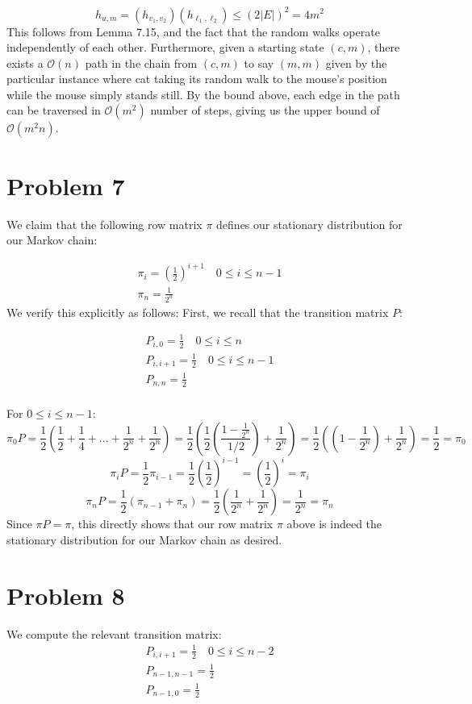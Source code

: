 \documentclass[12pt]{article}%
\begin{document}
$$ h_{u,m} = (h_{v_1,v_2})(h_{\ell_1,\ell_2}) \leq (2|E|)^2 = 4m^2 $$
This follows from Lemma 7.15, and the fact that the random walks operate independently of each other. Furthermore, given a starting state $(c,m)$, there exists a $\mathcal{O}(n)$ path in the chain from $(c,m)$ to say $(m,m)$ given by the particular instance where cat taking its random walk to the mouse's position while the mouse simply stands still. By the bound above, each edge in the path can be traversed in $\mathcal{O}(m^2)$ number of steps, giving us the upper bound of $\mathcal{O}(m^2n)$.

\section*{Problem 7}
We claim that the following row matrix $\pi$ defines our stationary distribution for our Markov chain:

\begin{gather*}
\pi_{i} = {\left(\frac{1}{2}\right)^{i+1}} \quad 0 \leq i \leq n-1 \\
\pi_{n} = \frac{1}{2^{n}}
\end{gather*}
We verify this explicitly as follows: First, we recall that the transition matrix $P$:

\begin{gather*}
P_{i,0} = \frac{1}{2} \quad 0 \leq i \leq n \\
P_{i,i+1} = \frac{1}{2} \quad 0 \leq i \leq n-1 \\
P_{n,n} = \frac{1}{2} \\
\end{gather*}

For $ 0 \leq i \leq n-1$:
$$ \pi_0 P = \frac{1}{2}\left(\frac{1}{2} + \frac{1}{4} + ... + \frac{1}{2^n} + \frac{1}{2^n}\right) = \frac{1}{2}\left(\frac{1}{2}\left(\frac{1 - \frac{1}{2^n}}{1/2}\right) + \frac{1}{2^n}\right) = \frac{1}{2}\left(\left(1 - \frac{1}{2^n} \right) + \frac{1}{2^n}\right) = \frac{1}{2} = \pi_0 $$
$$ \pi_{i} P = \frac{1}{2}\pi_{i-1} = \frac{1}{2}\left(\frac{1}{2}\right)^{i-1} =  \left(\frac{1}{2}\right)^{i} = \pi_i$$
$$ \pi_n P = \frac{1}{2}\left(\pi_{n-1} + \pi_{n}\right) = \frac{1}{2}\left(\frac{1}{2^n} + \frac{1}{2^n}\right) = \frac{1}{2^n} = \pi_n $$
Since $\pi P = \pi$, this directly shows that our row matrix $\pi$ above is indeed the stationary distribution for our Markov chain as desired.

\section*{Problem 8}
We compute the relevant transition matrix:
\begin{gather*}
  P_{i,i+1} = \frac{1}{2} \quad 0 \leq i \leq n-2 \\
  P_{n-1,n-1} = \frac{1}{2} \\
  P_{n-1,0} = \frac{1}{2}
\end{gather*}
\end{document}
